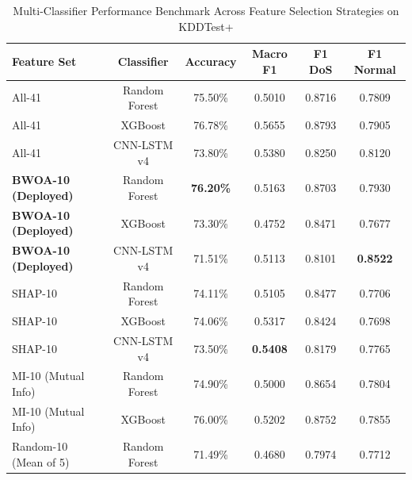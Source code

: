 \documentclass[conference]{IEEEtran}
\begin{document}
\begin{table}[htbp]
\caption{Multi-Classifier Performance Benchmark Across Feature Selection Strategies on KDDTest+}
\label{tab:feature_comparison}
\centering
\begin{tabularx}{\columnwidth}{lccccc}
\toprule
\textbf{Feature Set} & \textbf{Classifier} & \textbf{Accuracy} & \textbf{Macro F1} & \textbf{F1 DoS} & \textbf{F1 Normal} \\
\midrule
All-41 & Random Forest & 75.50\% & 0.5010 & 0.8716 & 0.7809 \\
All-41 & XGBoost & 76.78\% & 0.5655 & 0.8793 & 0.7905 \\
All-41 & CNN-LSTM v4 & 73.80\% & 0.5380 & 0.8250 & 0.8120 \\
\midrule
\textbf{BWOA-10 (Deployed)} & Random Forest & \textbf{76.20\%} & 0.5163 & 0.8703 & 0.7930 \\
\textbf{BWOA-10 (Deployed)} & XGBoost & 73.30\% & 0.4752 & 0.8471 & 0.7677 \\
\textbf{BWOA-10 (Deployed)} & CNN-LSTM v4 & 71.51\% & 0.5113 & 0.8101 & \textbf{0.8522} \\
\midrule
SHAP-10 & Random Forest & 74.11\% & 0.5105 & 0.8477 & 0.7706 \\
SHAP-10 & XGBoost & 74.06\% & 0.5317 & 0.8424 & 0.7698 \\
SHAP-10 & CNN-LSTM v4 & 73.50\% & \textbf{0.5408} & 0.8179 & 0.7765 \\
\midrule
MI-10 (Mutual Info) & Random Forest & 74.90\% & 0.5000 & 0.8654 & 0.7804 \\
MI-10 (Mutual Info) & XGBoost & 76.00\% & 0.5202 & 0.8752 & 0.7855 \\
Random-10 (Mean of 5) & Random Forest & 71.49\% & 0.4680 & 0.7974 & 0.7712 \\
\bottomrule
\end{tabularx}
\end{table}
\end{document}
